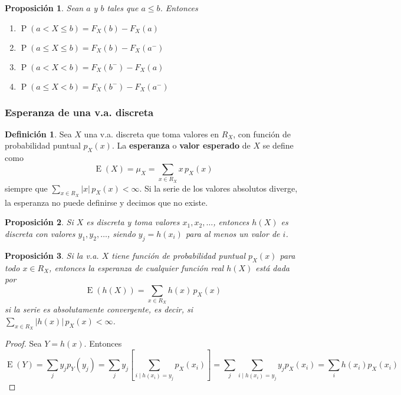 \documentclass[11pt]{article}
\theoremstyle{plain}
\newtheorem*{pro}{Proposición}
\theoremstyle{definition}
\newtheorem*{defi}{Definición}
\theoremstyle{remark}
\newcommand{\deft}[1]{\textbf{#1}}  %
\newcommand{\proba}{\ensuremath{\operatorname{P}}}  %
\newcommand{\esp}[0]{\ensuremath{\operatorname{E}}}  %
\begin{document}
    \begin{pro}
      Sean $a$ y $b$ tales que $a \leq b$. Entonces
      \begin{enumerate}
        \item $\proba(a < X \leq b) = F_X(b) - F_X(a)$
        \item $\proba(a \leq X \leq b) = F_X(b) - F_X(a^-)$
        \item $\proba(a < X < b) = F_X(b^-) - F_X(a)$
        \item $\proba(a \leq X < b) = F_X(b^-) - F_X(a^-)$
      \end{enumerate}
    \end{pro}

    \subsubsection{Esperanza de una v.a. discreta}

      \begin{defi}
        Sea $X$ una v.a. discreta que toma valores en $R_X$, con función de probabilidad puntual $p_X(x)$. La \deft{esperanza} o \deft{valor esperado} de $X$ se define como
        \[ \esp(X) = \mu_X = \sum_{x \in R_X} x \, p_X(x) \]
        siempre que $\sum_{x \in R_X} |x| \, p_X(x) < \infty $. Si la serie de los valores absolutos diverge, la esperanza no puede definirse y decimos que no existe.
      \end{defi}

      \begin{pro}
        Si $X$ es discreta y toma valores $x_1, x_2, \dots$, entonces $h(X)$ es discreta con valores $y_1, y_2, \dots$, siendo $y_j = h(x_i)$ para al menos un valor de $i$.
      \end{pro}

      \begin{pro}
        Si la v.a. $X$ tiene función de probabilidad puntual $p_X(x)$ para todo $x \in R_X$, entonces la esperanza de cualquier función real $h(X)$ está dada por
        \[ \esp(h(X)) = \sum_{x \in R_X} h(x) \, p_X(x) \]
        si la serie es absolutamente convergente, es decir, si $\sum_{x \in R_X} |h(x)| \, p_X(x) < \infty $.
      \end{pro}
      \begin{proof}
        Sea $Y = h(x)$. Entonces
        \[ \esp(Y) = \sum_j y_j p_Y(y_j) = \sum_j y_j \left[ \sum_{i \mid h(x_i) = y_j} p_X(x_i) \right] = \sum_j \sum_{i \mid h(x_i) = y_j} y_j p_X(x_i) = \sum_i h(x_i) p_X(x_i) \]
      \end{proof}
\end{document}
